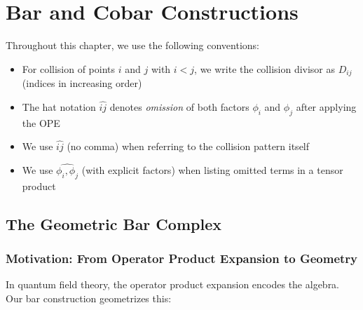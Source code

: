 \chapter{Bar and Cobar Constructions}

\begin{convention}\label{conv:set-notation}
Throughout this chapter, we use the following conventions:
\begin{itemize}
\item For collision of points $i$ and $j$ with $i < j$, we write the collision divisor as $D_{ij}$ (indices in increasing order)
\item The hat notation $\widehat{ij}$ denotes \emph{omission} of both factors $\phi_i$ and $\phi_j$ after applying the OPE
\item We use $\widehat{ij}$ (no comma) when referring to the collision pattern itself
\item We use $\widehat{\phi_i, \phi_j}$ (with explicit factors) when listing omitted terms in a tensor product
\end{itemize}
\end{convention}

\section{The Geometric Bar Complex}

\subsection{Motivation: From Operator Product Expansion to Geometry}

In quantum field theory, the operator product expansion encodes the algebra. Our bar construction geometrizes this:

\begin{center}
\end{center}

